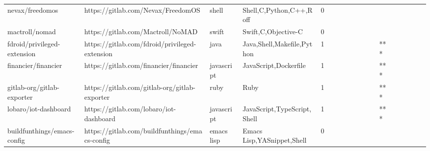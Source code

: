 \begin{tabular}{llllrlllllllllllll}
nevax/freedomos                                    &                 https://gitlab.com/Nevax/FreedomOS &             shell &                            Shell,C,Python,C++,Roff &       0 &         &        &           &                &                 &        &           &           &          &          &       &              &          \\
mactroll/nomad                                     &                  https://gitlab.com/Mactroll/NoMAD &             swift &                                Swift,C,Objective-C &       0 &         &        &           &                &                 &        &           &           &          &          &       &              &          \\
fdroid/privileged-extension                        &     https://gitlab.com/fdroid/privileged-extension &              java &                         Java,Shell,Makefile,Python &       1 &         &        &           &                &                 &        &           &       *** &          &          &       &              &          \\
financier/financier                                &             https://gitlab.com/financier/financier &        javascript &                              JavaScript,Dockerfile &       1 &         &        &           &                &                 &        &           &       *** &          &          &       &              &          \\
gitlab-org/gitlab-exporter                         &      https://gitlab.com/gitlab-org/gitlab-exporter &              ruby &                                               Ruby &       1 &         &        &           &                &                 &        &           &       *** &          &          &       &              &          \\
lobaro/iot-dashboard                               &            https://gitlab.com/lobaro/iot-dashboard &        javascript &                        JavaScript,TypeScript,Shell &       1 &         &        &           &                &                 &        &           &       *** &          &          &       &              &          \\
buildfunthings/emacs-config                        &     https://gitlab.com/buildfunthings/emacs-config &        emacs lisp &                         Emacs Lisp,YASnippet,Shell &       0 &         &        &           &                &                 &        &           &           &          &          &       &              &          \\

\end{tabular}
